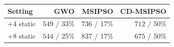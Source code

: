 \begin{tabular}{lrrr}
\hline
Setting & GWO & MSIPSO & CD-MSIPSO \\
\hline
+4 static & $549$ / 33\% & $736$ / 17\% & $712$ / 50\% \\
+8 static & $544$ / 25\% & $837$ / 17\% & $675$ / 50\% \\
\hline
\end{tabular}